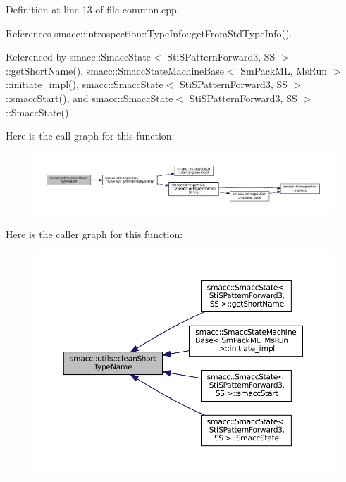 Definition at line 13 of file common.\+cpp.



References smacc\+::introspection\+::\+Type\+Info\+::get\+From\+Std\+Type\+Info().



Referenced by smacc\+::\+Smacc\+State$<$ Sti\+S\+Pattern\+Forward3, S\+S $>$\+::get\+Short\+Name(), smacc\+::\+Smacc\+State\+Machine\+Base$<$ Sm\+Pack\+M\+L, Ms\+Run $>$\+::initiate\+\_\+impl(), smacc\+::\+Smacc\+State$<$ Sti\+S\+Pattern\+Forward3, S\+S $>$\+::smacc\+Start(), and smacc\+::\+Smacc\+State$<$ Sti\+S\+Pattern\+Forward3, S\+S $>$\+::\+Smacc\+State().


Here is the call graph for this function\+:
\nopagebreak
\begin{figure}[H]
\begin{center}
\leavevmode
\includegraphics[width=350pt]{namespacesmacc_1_1utils_aacd1975bb7cd9bec4b50e111a2ae7edb_cgraph}
\end{center}
\end{figure}
Here is the caller graph for this function\+:
\nopagebreak
\begin{figure}[H]
\begin{center}
\leavevmode
\includegraphics[width=350pt]{namespacesmacc_1_1utils_aacd1975bb7cd9bec4b50e111a2ae7edb_icgraph}
\end{center}
\end{figure}
